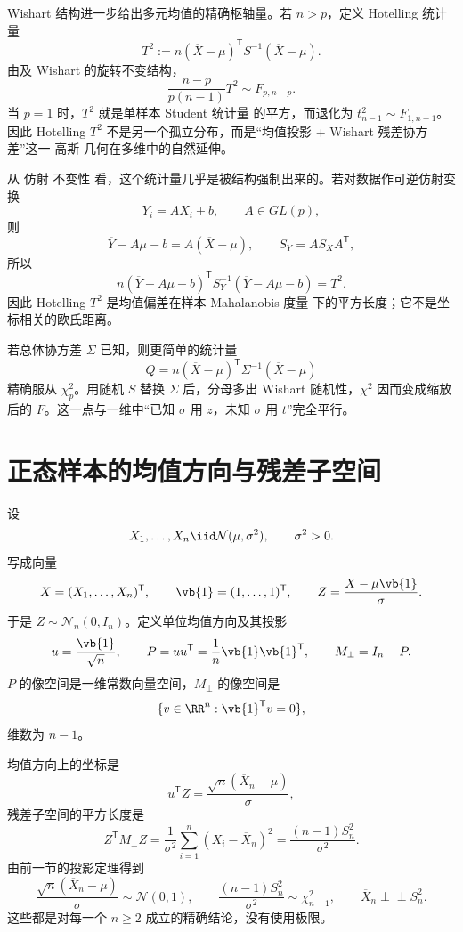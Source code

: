 Wishart 结构进一步给出多元均值的精确枢轴量。若 $n>p$，定义 Hotelling 统计量
\begin{equation*}T^2
:=n(\overline X-\mu)^{\mathsf T}S^{-1}(\overline X-\mu).\end{equation*}
由及 Wishart 的旋转不变结构，
\begin{equation}
{
\frac{n-p}{p(n-1)}T^2
\sim F_{p,n-p}.
}
\label{eq:math-stat-hotelling-f}
\end{equation}
当 $p=1$ 时，$T^2$ 就是单样本 Student 统计量 的平方，而退化为 $t_{n-1}^2\sim F_{1,n-1}$。因此 Hotelling $T^2$ 不是另一个孤立分布，而是“均值投影 + Wishart 残差协方差”这一 高斯 几何在多维中的自然延伸。

从 仿射 不变性 看，这个统计量几乎是被结构强制出来的。若对数据作可逆仿射变换
\[
Y_i=AX_i+b,
\qquad A\in GL(p),
\]
则
\[
\overline Y-A\mu-b=A(\overline X-\mu),
\qquad
S_Y=AS_XA^{\mathsf T},
\]
所以
\[
n(\overline Y-A\mu-b)^{\mathsf T}
S_Y^{-1}
(\overline Y-A\mu-b)
=T^2.
\]
因此 Hotelling $T^2$ 是均值偏差在样本 Mahalanobis 度量 下的平方长度；它不是坐标相关的欧氏距离。

若总体协方差 $\Sigma$ 已知，则更简单的统计量
\[
Q=n(\overline X-\mu)^{\mathsf T}
\Sigma^{-1}(\overline X-\mu)
\]
精确服从 $\chi^2_p$。用随机 $S$ 替换 $\Sigma$ 后，分母多出 Wishart 随机性，$\chi^2$ 因而变成缩放后的 $F$。这一点与一维中“已知 $\sigma$ 用 $z$，未知 $\sigma$ 用 $t$”完全平行。

\section{正态样本的均值方向与残差子空间}

设
\[
 X_1,\ldots,X_n\iid\mathcal N(\mu,\sigma^2),
 \qquad \sigma^2>0.
\]
写成向量
\[
 X=(X_1,\ldots,X_n)^{\mathsf T},
 \qquad
 \vb{1}=(1,\ldots,1)^{\mathsf T},
 \qquad
 Z=\frac{X-\mu\vb{1}}{\sigma}.
\]
于是 $Z\sim\mathcal N_n(0,I_n)$。定义单位均值方向及其投影
\[
 u=\frac{\vb{1}}{\sqrt n},
 \qquad
 P=uu^{\mathsf T}=\frac1n\vb{1}\vb{1}^{\mathsf T},
 \qquad
 M_\perp=I_n-P.
\]
$P$ 的像空间是一维常数向量空间，$M_\perp$ 的像空间是
\[
 \{v\in\RR^n:\vb{1}^{\mathsf T}v=0\},
\]
维数为 $n-1$。

均值方向上的坐标是
\[
 u^{\mathsf T}Z
 =\frac{\sqrt n(\overline X_n-\mu)}{\sigma},
\]
残差子空间的平方长度是
\[
 Z^{\mathsf T}M_\perp Z
 =\frac1{\sigma^2}\sum_{i=1}^n(X_i-\overline X_n)^2
 =\frac{(n-1)S_n^2}{\sigma^2}.
\]
由前一节的投影定理得到
\begin{equation}\label{eq:math-stat-normal-mean-variance-independence}
 \frac{\sqrt n(\overline X_n-\mu)}{\sigma}\sim\mathcal N(0,1),
 \qquad
 \frac{(n-1)S_n^2}{\sigma^2}\sim\chi^2_{n-1},
 \qquad
 \overline X_n\mathrel{\perp\!\!\!\perp}S_n^2.
\end{equation}
这些都是对每一个 $n\ge2$ 成立的精确结论，没有使用极限。

